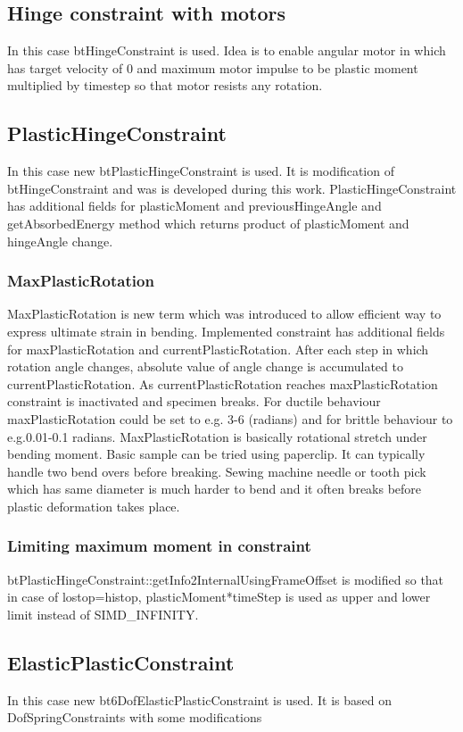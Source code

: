\subsection{Hinge constraint with motors}
In this case btHingeConstraint is used.
Idea is to enable angular motor in which has target velocity of 0 and maximum motor impulse to 
be plastic moment multiplied by timestep so that motor resists any rotation.

\subsection{PlasticHingeConstraint}
In this case new btPlasticHingeConstraint is used.
It is modification of btHingeConstraint and was is developed during this work.
PlasticHingeConstraint has additional fields for plasticMoment and previousHingeAngle and 
getAbsorbedEnergy method which returns product of plasticMoment and hingeAngle change.

\subsubsection{MaxPlasticRotation}
MaxPlasticRotation is new term which was introduced to allow efficient way to express ultimate strain in bending.
Implemented constraint has additional fields for maxPlasticRotation and currentPlasticRotation. 
After each step in which rotation angle changes, absolute value of 
angle change is accumulated to currentPlasticRotation. As currentPlasticRotation 
reaches maxPlasticRotation constraint is inactivated and specimen breaks. 
For ductile behaviour maxPlasticRotation could be set to e.g. 3-6 (radians) and for brittle
 behaviour to e.g.0.01-0.1 radians. MaxPlasticRotation is basically rotational stretch under bending moment.
 Basic sample can be tried using paperclip. It can typically handle two bend overs before breaking. 
Sewing machine needle or tooth pick which has same diameter is much harder to bend and it 
often breaks before plastic deformation takes place. 

\subsubsection{Limiting maximum moment in constraint}
btPlasticHingeConstraint::getInfo2InternalUsingFrameOffset is modified so that in case of lostop=histop, 
plasticMoment*timeStep is used as upper and lower limit instead of SIMD\_INFINITY. 

\subsection{ElasticPlasticConstraint}
In this case new bt6DofElasticPlasticConstraint is used.
It is based on DofSpringConstraints with some modifications

